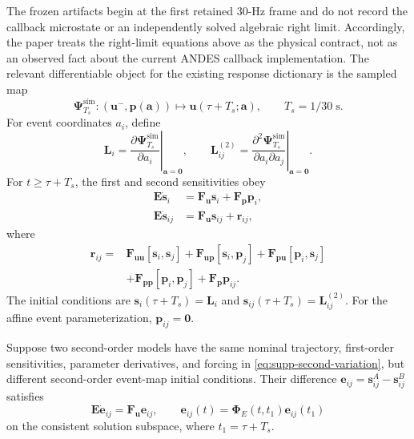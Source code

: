 The frozen artifacts begin at the first retained 30-Hz frame and do not record the
callback microstate or an independently solved algebraic right limit. Accordingly,
the paper treats the right-limit equations above as the physical contract, not as
an observed fact about the current ANDES callback implementation. The relevant
differentiable object for the existing response dictionary is the sampled map
\begin{equation}
 \bm\Psi_{T_s}^{\mathrm{sim}}:
 (\bm u^{-},\bm p(\bm a))\mapsto
 \bm u(\tau+T_s;\bm a),
 \qquad T_s=1/30\;\mathrm{s}.
 \label{eq:supp-sampled-event-map}
\end{equation}
For event coordinates $a_i$, define
\begin{equation}
 \bm L_i=\left.\frac{\partial\bm\Psi_{T_s}^{\mathrm{sim}}}{\partial a_i}\right|_{\bm a=\bm0},
 \qquad
 \bm L_{ij}^{(2)}=\left.\frac{\partial^2\bm\Psi_{T_s}^{\mathrm{sim}}}
 {\partial a_i\partial a_j}\right|_{\bm a=\bm0}.
 \label{eq:supp-event-map-derivatives}
\end{equation}
For $t\ge \tau+T_s$, the first and second sensitivities obey
\begin{align}
 \bm E\dot{\bm s}_i
 &=\bm F_{\bm u}\bm s_i+\bm F_{\bm p}\bm p_i,
 \label{eq:supp-first-variation}\\
 \bm E\dot{\bm s}_{ij}
 &=\bm F_{\bm u}\bm s_{ij}+\bm r_{ij},
 \label{eq:supp-second-variation}
\end{align}
where
\begin{align}
 \bm r_{ij}={}&\bm F_{\bm u\bm u}[\bm s_i,\bm s_j]
 +\bm F_{\bm u\bm p}[\bm s_i,\bm p_j]
 +\bm F_{\bm p\bm u}[\bm p_i,\bm s_j]\nonumber\\
 &+\bm F_{\bm p\bm p}[\bm p_i,\bm p_j]
 +\bm F_{\bm p}\bm p_{ij}.
 \label{eq:supp-second-forcing}
\end{align}
The initial conditions are $\bm s_i(\tau+T_s)=\bm L_i$ and $\bm s_{ij}(\tau+T_s)=\bm L_{ij}^{(2)}$. For the affine event parameterization, $\bm p_{ij}=\bm0$.

\begin{theorem}
Suppose two second-order models have the same nominal trajectory, first-order sensitivities, parameter derivatives, and forcing in \eqref{eq:supp-second-variation}, but different second-order event-map initial conditions. Their difference $\bm e_{ij}=\bm s_{ij}^{A}-\bm s_{ij}^{B}$ satisfies
\begin{equation}
 \bm E\dot{\bm e}_{ij}=\bm F_{\bm u}\bm e_{ij},
 \qquad
 \bm e_{ij}(t)=\bm\Phi_E(t,t_1)\bm e_{ij}(t_1)
 \label{eq:supp-homogeneous-mismatch}
\end{equation}
on the consistent solution subspace, where $t_1=\tau+T_s$.
\end{theorem}

